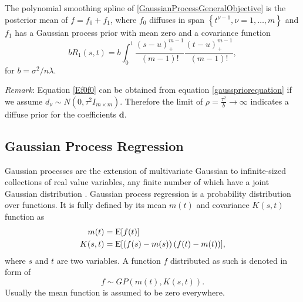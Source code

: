 \begin{theorem}\citep{gu2013smoothing}
The polynomial smoothing spline of \eqref{GaussianProcessGeneralObjective} is the posterior mean of $f = f_0 +f_1$, where $f_0$ diffuses in span $\left\lbrace t^{\nu-1}, \nu= 1, \ldots , m\right\rbrace$ and $f_1$ has a Gaussian process prior with mean zero and a covariance function
\begin{equation*}
bR_1(s,t) = b\int_{0}^{1} \frac{\left(s-u\right)_+^{m-1}}{(m-1)!} \frac{\left(t-u\right)_+^{m-1}}{(m-1)!},
\end{equation*}
for $b=\sigma^2/n\lambda$. 
\end{theorem}

\textit{Remark}: Equation \eqref{Ef0f0} can be obtained from equation \eqref{gausspriorequation} if we assume $d_\nu \sim N\left(0,\tau^2I_{m\times m}\right)$. Therefore the limit of $\rho=\frac{\tau^2}{b}\to\infty$ indicates a diffuse prior for the coefficients $\mathbf{d}$. 


\subsection{Gaussian Process Regression}

Gaussian processes are the extension of multivariate Gaussian to infinite-sized collections of real value variables, any finite number of which have a joint Gaussian distribution \citep{rasmussen2006gaussian}. Gaussian process regression is a probability distribution over functions. It is fully defined by its mean $m(t)$ and covariance $K(s,t)$ function as 
\begin{align*}
m(t)&=\mathrm{E} \lbrack f(t)\rbrack \\
K(s,t)&=\mathrm{E} \lbrack \left(f(s)-m(s)\right) \left(f(t)-m(t)\right)\rbrack,
\end{align*}
where $s$ and $t$ are two variables. A function $f$ distributed as such is denoted in form of 
\begin{equation*}
f \sim GP\left(m(t),K(s,t) \right).
\end{equation*}
Usually the mean function is assumed to be zero everywhere. 

